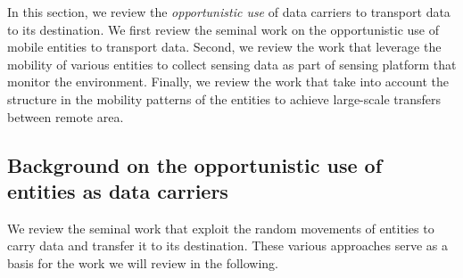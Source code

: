 In this section, we review the \textit{opportunistic use} of data carriers to transport data to its destination. We first review the seminal work on the opportunistic use of mobile entities to transport data. Second, we review the work  that leverage the mobility of various entities to collect sensing data as part of sensing platform that monitor the environment. Finally, we review the work that take into account the structure in the mobility patterns of the entities to achieve large-scale transfers between remote area. 


\subsection{Background on the opportunistic use of entities as data carriers}

We review the seminal work that exploit the random movements of entities to carry data and transfer it to its destination. These various approaches serve as a basis for the work we will review in the following.

